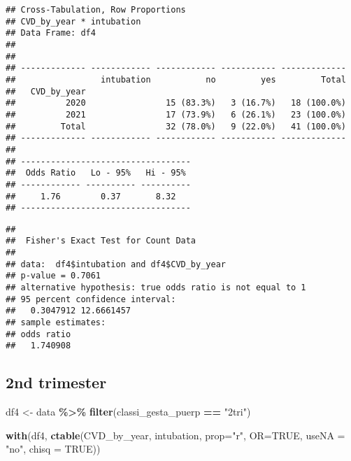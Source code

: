 \documentclass[
]{article}
\newenvironment{Shaded}{\begin{snugshade}}{\end{snugshade}}
\newcommand{\AttributeTok}[1]{\textcolor[rgb]{0.13,0.29,0.53}{#1}}
\newcommand{\ConstantTok}[1]{\textcolor[rgb]{0.56,0.35,0.01}{#1}}
\newcommand{\FunctionTok}[1]{\textcolor[rgb]{0.13,0.29,0.53}{\textbf{#1}}}
\newcommand{\NormalTok}[1]{#1}
\newcommand{\OtherTok}[1]{\textcolor[rgb]{0.56,0.35,0.01}{#1}}
\newcommand{\SpecialCharTok}[1]{\textcolor[rgb]{0.81,0.36,0.00}{\textbf{#1}}}
\newcommand{\StringTok}[1]{\textcolor[rgb]{0.31,0.60,0.02}{#1}}
\begin{document}
\begin{verbatim}
## Cross-Tabulation, Row Proportions  
## CVD_by_year * intubation  
## Data Frame: df4  
## 
## 
## ------------- ------------ ------------ ----------- -------------
##                 intubation           no         yes         Total
##   CVD_by_year                                                    
##          2020                15 (83.3%)   3 (16.7%)   18 (100.0%)
##          2021                17 (73.9%)   6 (26.1%)   23 (100.0%)
##         Total                32 (78.0%)   9 (22.0%)   41 (100.0%)
## ------------- ------------ ------------ ----------- -------------
## 
## ----------------------------------
##  Odds Ratio   Lo - 95%   Hi - 95% 
## ------------ ---------- ----------
##     1.76        0.37       8.32   
## ----------------------------------
\end{verbatim}

\begin{Shaded}
\end{Shaded}

\begin{verbatim}
## 
##  Fisher's Exact Test for Count Data
## 
## data:  df4$intubation and df4$CVD_by_year
## p-value = 0.7061
## alternative hypothesis: true odds ratio is not equal to 1
## 95 percent confidence interval:
##   0.3047912 12.6661457
## sample estimates:
## odds ratio 
##   1.740908
\end{verbatim}

\hypertarget{nd-trimester-7}{%
\subsection{2nd trimester}\label{nd-trimester-7}}

\begin{Shaded}
\begin{Highlighting}[]
\NormalTok{df4 }\OtherTok{\textless{}{-}}\NormalTok{ data }\SpecialCharTok{\%\textgreater{}\%} 
  \FunctionTok{filter}\NormalTok{(classi\_gesta\_puerp }\SpecialCharTok{==} \StringTok{"2tri"}\NormalTok{)}

\FunctionTok{with}\NormalTok{(df4, }\FunctionTok{ctable}\NormalTok{(CVD\_by\_year, intubation, }\AttributeTok{prop=}\StringTok{"r"}\NormalTok{, }\AttributeTok{OR=}\ConstantTok{TRUE}\NormalTok{, }\AttributeTok{useNA =} \StringTok{"no"}\NormalTok{, }\AttributeTok{chisq =} \ConstantTok{TRUE}\NormalTok{))}
\end{Highlighting}
\end{Shaded}
\end{document}
